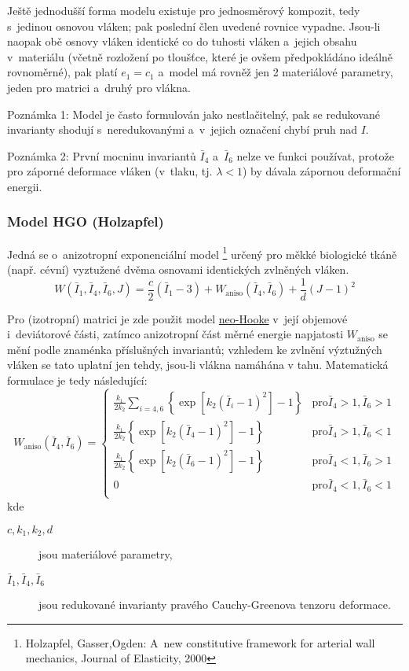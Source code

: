 Ještě jednodušší forma modelu existuje pro jednosměrový kompozit, tedy s~jedinou osnovou vláken; pak poslední člen uvedené rovnice vypadne. Jsou-li naopak obě osnovy vláken identické co do tuhosti vláken a~jejich obsahu v~materiálu (včetně rozložení po tloušťce, které je ovšem předpokládáno ideálně rovnoměrné), pak platí $e_1 = c_1$ a~model má rovněž jen 2 materiálové parametry, jeden pro matrici a~druhý pro vlákna.

Poznámka 1: Model je často formulován jako nestlačitelný, pak se redukované invarianty shodují s~neredukovanými a~v~jejich označení chybí pruh nad $I$.

Poznámka 2: První mocninu invariantů $\bar{I}_4$ a~$\bar{I}_6$ nelze ve funkci používat, protože pro záporné deformace vláken (v~tlaku, tj. $\lambda < 1$) by dávala zápornou deformační energii.

\subsubsection{Model HGO (Holzapfel)}\label{sec:model-hgo}
Jedná se o~anizotropní exponenciální model
\footnote{Holzapfel, Gasser,Ogden: A~new constitutive framework for arterial wall mechanics, Journal of Elasticity, 2000}
určený pro měkké biologické tkáně (např. cévní) vyztužené dvěma osnovami identických zvlněných vláken.
\begin{equation}
	W(\bar{I}_1, \bar{I}_4, \bar{I}_6, J) = \frac{c}{2} (\bar{I}_1 - 3)
	+ W_\text{aniso}(\bar{I}_4, \bar{I}_6)
	+ \frac{1}{d} (J - 1)^2
\end{equation}

Pro (izotropní) matrici je zde použit model \hyperref[sec:neo-hooke]{neo-Hooke} v~její objemové i~deviátorové části, zatímco anizotropní část měrné energie napjatosti $W_\text{aniso}$ se mění podle znaménka příslušných invariantů; vzhledem ke zvlnění výztužných vláken se tato uplatní jen tehdy, jsou-li vlákna namáhána v tahu. Matematická formulace je tedy následující:
\begin{equation}
	W_\text{aniso}(\bar{I}_4, \bar{I}_6) = \begin{cases}
		\frac{k_1}{2 k_2} \sum\limits_{i=4,6} \left\{ \exp\left[ k_2 \left( \bar{I}_i - 1 \right)^2 \right] - 1 \right\} & \text{pro} \bar{I}_4 > 1, \bar{I}_6 > 1\\
		\frac{k_1}{2 k_2} \left\{ \exp\left[ k_2 \left( \bar{I}_4 - 1 \right)^2 \right] - 1 \right\} & \text{pro} \bar{I}_4 > 1, \bar{I}_6 < 1\\
		\frac{k_1}{2 k_2} \left\{ \exp\left[ k_2 \left( \bar{I}_6 - 1 \right)^2 \right] - 1 \right\} & \text{pro} \bar{I}_4 < 1, \bar{I}_6 > 1\\
		0 & \text{pro} \bar{I}_4 < 1, \bar{I}_6 < 1\\
	\end{cases}
\end{equation}
kde
\begin{description}
	\item[$c, k_1, k_2, d$] jsou materiálové parametry,
	\item[$\bar{I}_1, \bar{I}_4, \bar{I}_6$] jsou redukované invarianty pravého Cauchy-Greenova tenzoru deformace.
\end{description}
